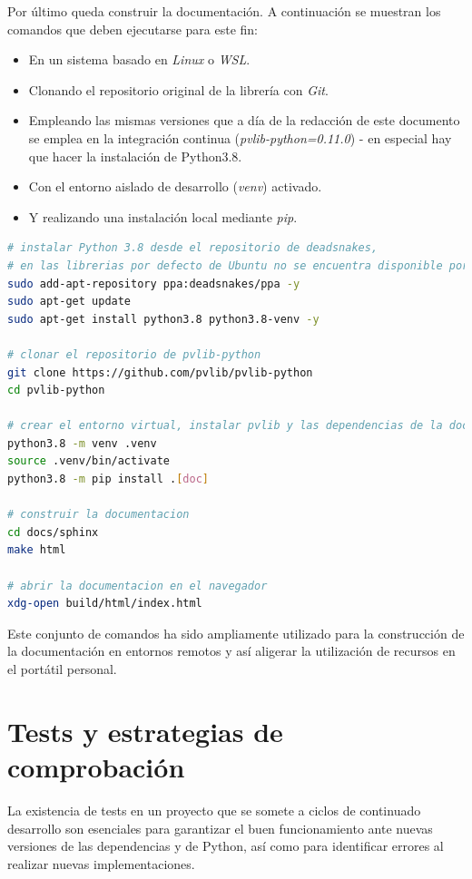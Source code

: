Por último queda construir la documentación. A continuación se muestran los comandos que deben ejecutarse para este fin:

\begin{itemize}
    \item En un sistema basado en \textit{Linux} o \textit{WSL}.
    \item Clonando el repositorio original de la librería con \textit{Git}.
    \item Empleando las mismas versiones que a día de la redacción de este documento se emplea en la integración continua (\textit{pvlib-python=0.11.0}) - en especial hay que hacer la instalación de Python3.8.
    \item Con el entorno aislado de desarrollo (\textit{venv}) activado.
    \item Y realizando una instalación local mediante \textit{pip}.
\end{itemize}

\begin{lstlisting}[language=bash, caption={Comandos para construir la documentación de \pvlibpy{}.}, label={lst:doc_build}]
# instalar Python 3.8 desde el repositorio de deadsnakes,
# en las librerias por defecto de Ubuntu no se encuentra disponible por antiguedad
sudo add-apt-repository ppa:deadsnakes/ppa -y
sudo apt-get update
sudo apt-get install python3.8 python3.8-venv -y

# clonar el repositorio de pvlib-python
git clone https://github.com/pvlib/pvlib-python
cd pvlib-python

# crear el entorno virtual, instalar pvlib y las dependencias de la documentacion
python3.8 -m venv .venv
source .venv/bin/activate
python3.8 -m pip install .[doc]

# construir la documentacion
cd docs/sphinx
make html

# abrir la documentacion en el navegador
xdg-open build/html/index.html
\end{lstlisting}

Este conjunto de comandos ha sido ampliamente utilizado para la construcción de la documentación en entornos remotos y así aligerar la utilización de recursos en el portátil personal.

\section{Tests y estrategias de comprobación}

La existencia de tests en un proyecto que se somete a ciclos de continuado desarrollo son esenciales para garantizar el buen funcionamiento ante nuevas versiones de las dependencias y de Python, así como para identificar errores al realizar nuevas implementaciones.

